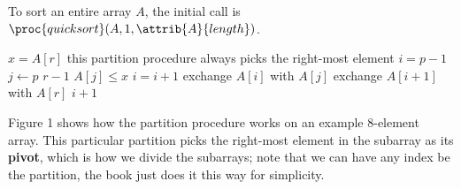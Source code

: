 \documentclass{article}
\begin{document}
To sort an entire array $A$, the initial call is $\proc{quicksort}(A, 1, \attrib{A}{length})$.

\begin{codebox}
\li $x = A[r]$ \Comment this partition procedure always picks the right-most element 
\li $i = p-1$
\li \For $j \gets p$ \To $r-1$
    \Do
\li     \If $A[j] \leq x$
            \Then
\li             $i = i + 1$
\li             exchange $A[i]$ with $A[j]$
            \End
    \End
\li exchange $A[i+1]$ with $A[r]$
\li \Return $i + 1$
\end{codebox}

Figure 1 shows how the partition procedure works on an example 8-element array. This particular partition picks the right-most element in the subarray as its \textbf{pivot}, which is how we divide the subarrays; note that we can have any index be the partition, the book just does it this way for simplicity.
\end{document}
